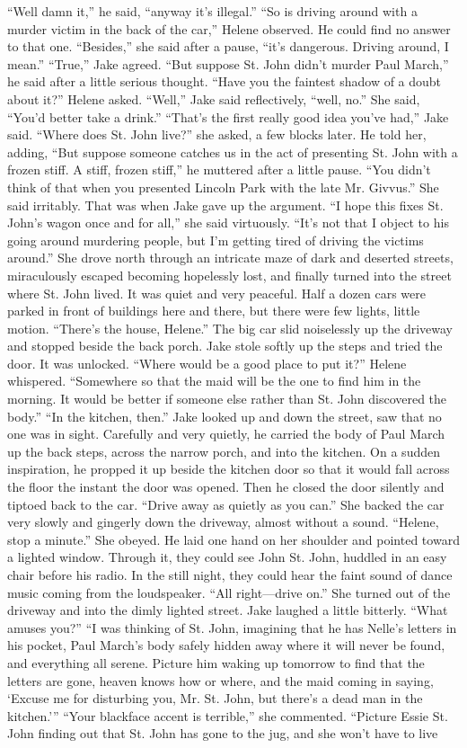 \documentclass{novel}
\begin{document}
“Well damn it,” he said, “anyway it’s illegal.” “So is driving around with a murder victim in the back of the car,” Helene observed. He could find no answer to that one. “Besides,” she said after a pause, “it’s dangerous. Driving around, I mean.” “True,” Jake agreed. “But suppose St. John didn’t murder Paul March,” he said after a little serious thought. “Have you the faintest shadow of a doubt about it?” Helene asked. “Well,” Jake said reflectively, “well, no.” She said, “You’d better take a drink.” “That’s the first really good idea you’ve had,” Jake said. “Where does St. John live?” she asked, a few blocks later. He told her, adding, “But suppose someone catches us in the act of presenting St. John with a frozen stiff. A stiff, frozen stiff,” he muttered after a little pause. “You didn’t think of that when you presented Lincoln Park with the late Mr. Givvus.” She said irritably. That was when Jake gave up the argument. “I hope this fixes St. John’s wagon once and for all,” she said virtuously. “It’s not that I object to his going around murdering people, but I’m getting tired of driving the victims around.” She drove north through an intricate maze of dark and deserted streets, miraculously escaped becoming hopelessly lost, and finally turned into the street where St. John lived. It was quiet and very peaceful. Half a dozen cars were parked in front of buildings here and there, but there were few lights, little motion. “There’s the house, Helene.” The big car slid noiselessly up the driveway and stopped beside the back porch. Jake stole softly up the steps and tried the door. It was unlocked. “Where would be a good place to put it?” Helene whispered. “Somewhere so that the maid will be the one to find him in the morning. It would be better if someone else rather than St. John discovered the body.” “In the kitchen, then.” Jake looked up and down the street, saw that no one was in sight. Carefully and very quietly, he carried the body of Paul March up the back steps, across the narrow porch, and into the kitchen. On a sudden inspiration, he propped it up beside the kitchen door so that it would fall across the floor the instant the door was opened. Then he closed the door silently and tiptoed back to the car. “Drive away as quietly as you can.” She backed the car very slowly and gingerly down the driveway, almost without a sound. “Helene, stop a minute.” She obeyed. He laid one hand on her shoulder and pointed toward a lighted window. Through it, they could see John St. John, huddled in an easy chair before his radio. In the still night, they could hear the faint sound of dance music coming from the loudspeaker. “All right—drive on.” She turned out of the driveway and into the dimly lighted street. Jake laughed a little bitterly. “What amuses you?” “I was thinking of St. John, imagining that he has Nelle’s letters in his pocket, Paul March’s body safely hidden away where it will never be found, and everything all serene. Picture him waking up tomorrow to find that the letters are gone, heaven knows how or where, and the maid coming in saying, ‘Excuse me for disturbing you, Mr. St. John, but there's a dead man in the kitchen.’” “Your blackface accent is terrible,” she commented. “Picture Essie St. John finding out that St. John has gone to the jug, and she won’t have to live 
\end{document}
